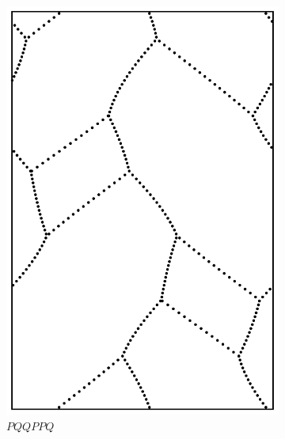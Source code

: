 \documentclass[12pt,twoside]{reedthesis}
\theoremstyle{definition}
\begin{document}
\begin{figure}[h]
  \centering
  \begin{subfigure}[t]{0.24\textwidth}
    \includegraphics[width=\textwidth]{figures/string_cheese_appendix/pqqppq.pdf}
    \caption*{$PQQPPQ$}
    \vspace{5mm}
  \end{subfigure}
  \hfill
  \begin{subfigure}[t]{0.24\textwidth}

\end{subfigure}
\end{figure}
\end{document}
